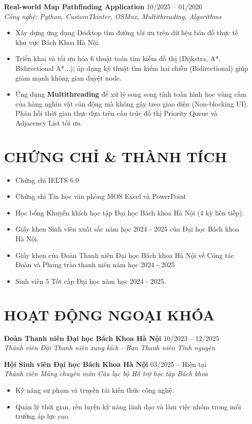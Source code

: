 \documentclass[a4paper,11pt]{article}
\begin{document}
\vspace{6pt}

\textbf{Real-world Map Pathfinding Application} \hfill 10/2025 -- 01/2026 \\
\textit{Công nghệ: Python, CustomTkinter, OSMnx, Multithreading, Algorithms}
\begin{itemize}[leftmargin=*, noitemsep]
    \item Xây dựng ứng dụng Desktop tìm đường tối ưu trên dữ liệu bản đồ thực tế khu vực Bách Khoa Hà Nội.
    \item Triển khai và tối ưu hóa 6 thuật toán tìm kiếm đồ thị (Dijkstra, A*, Bidirectional A*...); áp dụng kỹ thuật tìm kiếm hai chiều (Bidirectional) giúp giảm mạnh không gian duyệt node.
    \item Ứng dụng \textbf{Multithreading} để xử lý song song tính toán hình học vùng cấm của hàng nghìn vật cản động mà không gây treo giao diện (Non-blocking UI). Phản hồi thời gian thực dựa trên cấu trúc đồ thị Priority Queue và Adjacency List tối ưu.
\end{itemize}

\section{CHỨNG CHỈ \& THÀNH TÍCH}
\begin{itemize}[leftmargin=*, noitemsep]
    \item Chứng chỉ IELTS 6.0
    \item Chứng chỉ Tin học văn phòng MOS Excel và PowerPoint
    \item Học bổng Khuyến khích học tập Đại học Bách khoa Hà Nội (4 kỳ liên tiếp).
    \item Giấy khen Sinh viên xuất sắc năm học 2024 - 2025 của Đại học Bách khoa Hà Nội.
    \item Giấy khen của Đoàn Thanh niên Đại học Bách khoa Hà Nội về Công tác Đoàn và Phong trào thanh niên năm học 2024 - 2025
    \item Sinh viên 5 Tốt cấp Đại học năm học 2024 - 2025.
\end{itemize}

\section{HOẠT ĐỘNG NGOẠI KHÓA}
\textbf{Đoàn Thanh niên Đại học Bách Khoa Hà Nội} \hfill 10/2023 -- 12/2025 \\
\textit{Thành viên Đội Thanh niên xung kích - Ban Thanh niên Tình nguyện}

\textbf{Hội Sinh viên Đại học Bách Khoa Hà Nội} \hfill 03/2025 -- Hiện tại \\
\textit{Thành viên Mảng chuyên môn Câu lạc bộ Hỗ trợ học tập Bách khoa}

\begin{itemize}[leftmargin=*, noitemsep]
    \item Kỹ năng sư phạm và truyền tải kiến thức công nghệ.
    \item Quản lý thời gian, rèn luyện kỹ năng lãnh đạo và làm việc nhóm trong môi trường áp lực cao.
\end{itemize}
\end{document}
